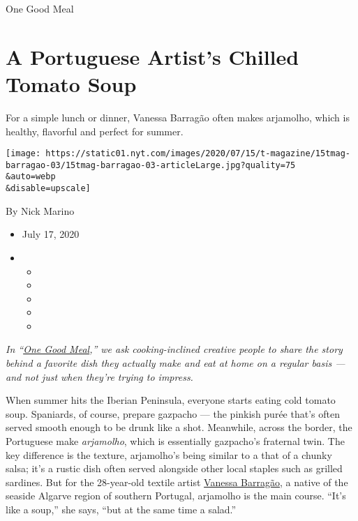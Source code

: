 One Good Meal

\hypertarget{a-portuguese-artists-chilled-tomato-soup}{%
\section{A Portuguese Artist's Chilled Tomato
Soup}\label{a-portuguese-artists-chilled-tomato-soup}}

For a simple lunch or dinner, Vanessa Barragão often makes arjamolho,
which is healthy, flavorful and perfect for summer.

\texttt{[image: https://static01.nyt.com/images/2020/07/15/t-magazine/15tmag-barragao-03/15tmag-barragao-03-articleLarge.jpg?quality=75\\\&auto=webp\\\&disable=upscale]}

By Nick Marino

\begin{itemize}
\item
  July 17, 2020
\item
  \begin{itemize}
  \item
  \item
  \item
  \item
  \item
  \end{itemize}
\end{itemize}

\emph{In
``}\href{https://www.nytimes.com/column/one-good-meal?module=inline}{\emph{One
Good Meal}}\emph{,'' we ask cooking-inclined creative people to share
the story behind a favorite dish they actually make and eat at home on a
regular basis --- and not just when they're trying to impress.}

When summer hits the Iberian Peninsula, everyone starts eating cold
tomato soup. Spaniards, of course, prepare gazpacho --- the pinkish
purée that's often served smooth enough to be drunk like a shot.
Meanwhile, across the border, the Portuguese make \emph{arjamolho},
which is essentially gazpacho's fraternal twin. The key difference is
the texture, arjamolho's being similar to a that of a chunky salsa; it's
a rustic dish often served alongside other local staples such as grilled
sardines. But for the 28-year-old textile artist
\href{https://www.instagram.com/vanessabarragao_work/?hl=en}{Vanessa
Barragão}, a native of the seaside Algarve region of southern Portugal,
arjamolho is the main course. ``It's like a soup,'' she says, ``but at
the same time a salad.''


